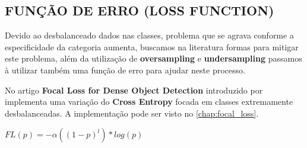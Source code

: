 \subsection{FUNÇÃO DE ERRO (LOSS FUNCTION)}

Devido ao desbalanceado dados nas classes, problema que se agrava conforme a especificidade da categoria aumenta, buscamos na literatura formas para mitigar este problema, além da utilização de \textbf{oversampling} e \textbf{undersampling} passamos à utilizar também uma função de erro para ajudar neste processo.

No artigo \textbf{Focal Loss for Dense Object Detection} introduzido por \cite{local_loss} implementa uma variação do \textbf{Cross Entropy} focada em classes extremamente desbalanceadas. A implementação pode ser visto no \autoref{chap:focal_loss}.

\begin{center}
    $FL(p) = -\alpha( (1 - p) ^ l) * log(p)$
\end{center}